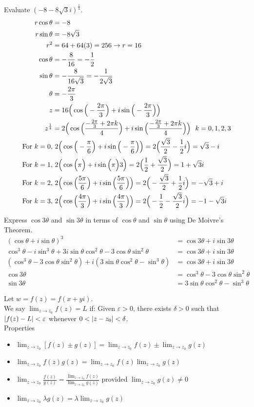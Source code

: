 \documentclass[12pt]{article}
\begin{document}
Evaluate $(-8 - 8\sqrt{3}i)^{\frac{1}{4}}$. 
$$ \begin{aligned} r\cos\theta &= -8 \\ r\sin\theta &= -8\sqrt{3} \\ r^2 &= 64 + 64(3) = 256 \to r = 16 \\ \cos\theta &= -\frac{8}{16} = -\frac{1}{2} \\ \sin\theta &= -\frac{8}{16\sqrt{3}} = - \frac{1}{2\sqrt{3}} \\ \theta &= -\frac{2\pi}{3} \\ z &= 16\Big( \cos\Big( -\frac{2\pi}{3} \Big) + i\sin\Big( -\frac{2\pi}{3} \Big)\Big) \\ z^{\frac{1}{4}} &= 2\Big( \cos\Big(  \frac{-\frac{2\pi}{3} + 2\pi k}{4} \Big) + i\sin\Big(  \frac{-\frac{2\pi}{3} + 2\pi k}{4} \Big) \Big) ~~ k = 0,1,2,3 \\ \text{For } k = 0, &~ 2\Big(\cos\Big( -\frac{\pi}{6} \Big) + i\sin\Big( -\frac{\pi}{6} \Big)\Big) = 2\Big( \frac{\sqrt{3}}{2} - \frac{1}{2}i\Big) = \sqrt{3} - i \\ \text{For } k = 1, &~ 2\Big(\cos\Big( \pi \Big) + i\sin\Big( \pi \Big){3}\Big) = 2\Big( \frac{1}{2} + \frac{\sqrt{3}}{2}\Big) = 1 + \sqrt{3}i \\ \text{For } k = 2, &~ 2\Big( \cos\Big( \frac{5\pi}{6} \Big) + i\sin\Big( \frac{5\pi}{6} \Big)\Big) = 2\Big( -\frac{\sqrt{3}}{2} + \frac{1}{2}i\Big) = -\sqrt{3} + i \\ \text{For } k = 3, &~ 2\Big( \cos\Big( \frac{4\pi}{3} \Big) + i\sin\Big( \frac{4\pi}{3} \Big) \Big) = 2\Big( -\frac{1}{2} - \frac{\sqrt{3}}{2}i\Big) = -1 - \sqrt{3}i \end{aligned} $$ 

Express $\cos 3\theta$ and $\sin 3\theta$ in terms of $\cos\theta$ and $\sin\theta$ using De Moivre's Theorem. 
$$ \begin{aligned} (\cos\theta + i\sin\theta)^3 &= \cos3\theta + i\sin3\theta \\ \cos^3 \theta - i\sin^3 \theta + 3i\sin\theta\cos^2\theta - 3\cos\theta\sin^2\theta &= \cos3\theta + i\sin3\theta \\ (\cos^3\theta - 3\cos\theta\sin^2\theta) + i(3\sin\theta\cos^2\theta - \sin^3\theta) &= \cos 3\theta + i\sin3\theta \\ \cos 3\theta &= \cos^3\theta - 3\cos\theta\sin^2\theta \\ \sin 3\theta &= 3\sin\theta\cos^2\theta - \sin^3\theta \end{aligned} $$ 

Let $w = f(z) = f(x + yi)$. \\
We say $\lim_{z \to z_0} f(z) = L$ if: Given $\varepsilon > 0$, there exists $\delta > 0$ such that $\abs{f(z) - L} < \varepsilon$ whenever $0 < \abs{z - z_0} < \delta$. \\
Properties \begin{itemize} 
\item $\lim_{z \to z_0} [f(z) \pm g(z)] = \lim_{z \to z_0} f(z) \pm \lim_{z \to z_0} g(z)$ 
\item $\lim_{z\to z_0} f(z)g(z) = \lim_{z\to z_0} f(z) \lim_{z \to z_0} g(z)$ 
\item $\lim_{z\to z_0} \frac{f(z)}{g(z)} = \frac{\lim_{z \to z_0} f(z)}{\lim_{z \to z_0} g(z)}$ provided $\lim_{z\to z_0} g(z) \neq 0 $ 
\item $\lim_{z\to z_0} \lambda g(z) = \lambda \lim_{z \to z_0} g(z)$ \end{itemize} 
\end{document}
